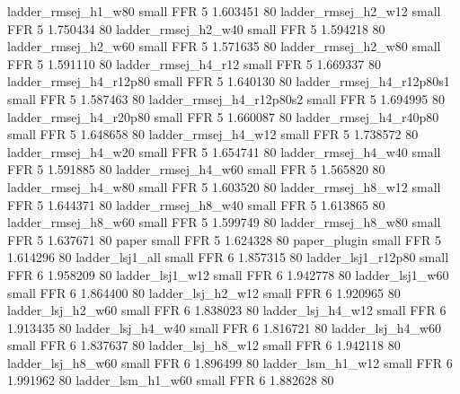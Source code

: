      ladder_rmsej_h1_w80      small      FFR                 5 1.603451 80
     ladder_rmsej_h2_w12      small      FFR                 5 1.750434 80
     ladder_rmsej_h2_w40      small      FFR                 5 1.594218 80
     ladder_rmsej_h2_w60      small      FFR                 5 1.571635 80
     ladder_rmsej_h2_w80      small      FFR                 5 1.591110 80
     ladder_rmsej_h4_r12      small      FFR                 5 1.669337 80
  ladder_rmsej_h4_r12p80      small      FFR                 5 1.640130 80
ladder_rmsej_h4_r12p80s1      small      FFR                 5 1.587463 80
ladder_rmsej_h4_r12p80s2      small      FFR                 5 1.694995 80
  ladder_rmsej_h4_r20p80      small      FFR                 5 1.660087 80
  ladder_rmsej_h4_r40p80      small      FFR                 5 1.648658 80
     ladder_rmsej_h4_w12      small      FFR                 5 1.738572 80
     ladder_rmsej_h4_w20      small      FFR                 5 1.654741 80
     ladder_rmsej_h4_w40      small      FFR                 5 1.591885 80
     ladder_rmsej_h4_w60      small      FFR                 5 1.565820 80
     ladder_rmsej_h4_w80      small      FFR                 5 1.603520 80
     ladder_rmsej_h8_w12      small      FFR                 5 1.644371 80
     ladder_rmsej_h8_w40      small      FFR                 5 1.613865 80
     ladder_rmsej_h8_w60      small      FFR                 5 1.599749 80
     ladder_rmsej_h8_w80      small      FFR                 5 1.637671 80
                   paper      small      FFR                 5 1.624328 80
            paper_plugin      small      FFR                 5 1.614296 80
         ladder_lsj1_all      small      FFR                 6 1.857315 80
      ladder_lsj1_r12p80      small      FFR                 6 1.958209 80
         ladder_lsj1_w12      small      FFR                 6 1.942778 80
         ladder_lsj1_w60      small      FFR                 6 1.864400 80
       ladder_lsj_h2_w12      small      FFR                 6 1.920965 80
       ladder_lsj_h2_w60      small      FFR                 6 1.838023 80
       ladder_lsj_h4_w12      small      FFR                 6 1.913435 80
       ladder_lsj_h4_w40      small      FFR                 6 1.816721 80
       ladder_lsj_h4_w60      small      FFR                 6 1.837637 80
       ladder_lsj_h8_w12      small      FFR                 6 1.942118 80
       ladder_lsj_h8_w60      small      FFR                 6 1.896499 80
       ladder_lsm_h1_w12      small      FFR                 6 1.991962 80
       ladder_lsm_h1_w60      small      FFR                 6 1.882628 80
